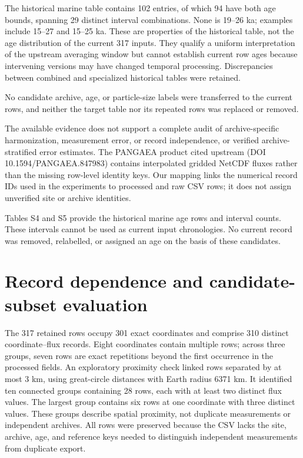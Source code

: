 \documentclass[11pt,a4paper]{article}
\begin{document}
The historical marine table contains 102 entries, of which 94 have both age bounds, spanning 29 distinct interval combinations. None is 19--26 ka; examples include 15--27 and 15--25 ka. These are properties of the historical table, not the age distribution of the current 317 inputs. They qualify a uniform interpretation of the upstream averaging window but cannot establish current row ages because intervening versions may have changed temporal processing. Discrepancies between combined and specialized historical tables were retained.

No candidate archive, age, or particle-size labels were transferred to the current rows, and neither the target table nor its repeated rows was replaced or removed.

The available evidence does not support a complete audit of archive-specific harmonization, measurement error, or record independence, or verified archive-stratified error estimates. The PANGAEA product cited upstream (DOI 10.1594/PANGAEA.847983) contains interpolated gridded NetCDF fluxes rather than the missing row-level identity keys. Our mapping links the numerical record IDs used in the experiments to processed and raw CSV rows; it does not assign unverified site or archive identities.

Tables S4 and S5 provide the historical marine age rows and interval counts. These intervals cannot be used as current input chronologies. No current record was removed, relabelled, or assigned an age on the basis of these candidates.

\section{Record dependence and candidate-subset evaluation}

The 317 retained rows occupy 301 exact coordinates and comprise 310 distinct coordinate--flux records. Eight coordinates contain multiple rows; across three groups, seven rows are exact repetitions beyond the first occurrence in the processed fields. An exploratory proximity check linked rows separated by at most 3 km, using great-circle distances with Earth radius 6371 km. It identified ten connected groups containing 28 rows, each with at least two distinct flux values. The largest group contains six rows at one coordinate with three distinct values. These groups describe spatial proximity, not duplicate measurements or independent archives. All rows were preserved because the CSV lacks the site, archive, age, and reference keys needed to distinguish independent measurements from duplicate export.
\end{document}
